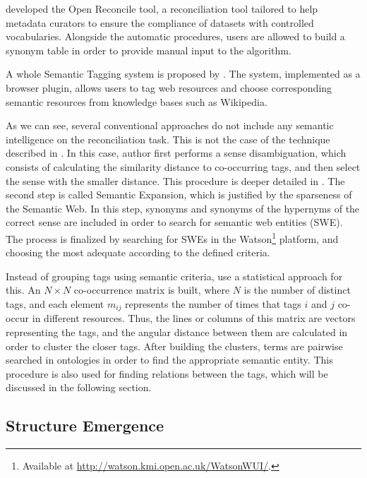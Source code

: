  developed the Open Reconcile tool, a reconciliation tool tailored to help metadata curators to ensure the compliance of datasets with controlled vocabularies.
Alongside the automatic procedures, users are allowed to build a synonym table in order to provide manual input to the algorithm.

A whole Semantic Tagging system is proposed by .
The system, implemented as a browser plugin, allows users to tag web resources and choose corresponding semantic resources from knowledge bases such as Wikipedia.

As we can see, several conventional approaches do not include any semantic intelligence on the reconciliation task.
This is not the case of the technique described in .
In this case, author first performs a sense disambiguation, which consists of calculating the similarity distance to co-occurring tags, and then select the sense with the smaller distance.
This procedure is deeper detailed in .
The second step is called Semantic Expansion, which is justified by the sparseness of the Semantic Web.
In this step, synonyms and synonyms of the hypernyms of the correct sense are included in order to search for semantic web entities (SWE).
The process is finalized by searching for SWEs in the Watson\footnote{Available at \url{http://watson.kmi.open.ac.uk/WatsonWUI/}.} platform, and choosing the most adequate according to the defined criteria.

Instead of grouping tags using semantic criteria,  use a statistical approach for this.
An $N \times N$ co-occurrence matrix is built, where $N$ is the number of distinct tags, and each element $m_{ij}$ represents the number of times that tags $i$ and $j$ co-occur in different resources.
Thus, the lines or columns of this matrix are vectors representing the tags, and the angular distance between them are calculated in order to cluster the closer tags.
After building the clusters, terms are pairwise searched in ontologies in order to find the appropriate semantic entity.
This procedure is also used for finding relations between the tags, which will be discussed in the following section.


\subsection{Structure Emergence}
\label{sec:emergence}

